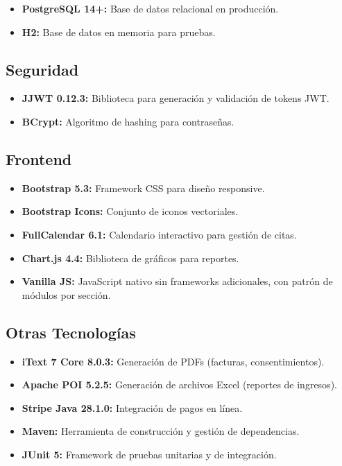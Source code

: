 \begin{itemize}
    \item \textbf{PostgreSQL 14+:} Base de datos relacional en producci\'on.
    \item \textbf{H2:} Base de datos en memoria para pruebas.
\end{itemize}

\subsection{Seguridad}

\begin{itemize}
    \item \textbf{JJWT 0.12.3:} Biblioteca para generaci\'on y validaci\'on de tokens JWT.
    \item \textbf{BCrypt:} Algoritmo de hashing para contrase\~nas.
\end{itemize}

\subsection{Frontend}

\begin{itemize}
    \item \textbf{Bootstrap 5.3:} Framework CSS para dise\~no responsive.
    \item \textbf{Bootstrap Icons:} Conjunto de iconos vectoriales.
    \item \textbf{FullCalendar 6.1:} Calendario interactivo para gesti\'on de citas.
    \item \textbf{Chart.js 4.4:} Biblioteca de gr\'aficos para reportes.
    \item \textbf{Vanilla JS:} JavaScript nativo sin frameworks adicionales, con patr\'on de m\'odulos por secci\'on.
\end{itemize}

\subsection{Otras Tecnolog\'ias}

\begin{itemize}
    \item \textbf{iText 7 Core 8.0.3:} Generaci\'on de PDFs (facturas, consentimientos).
    \item \textbf{Apache POI 5.2.5:} Generaci\'on de archivos Excel (reportes de ingresos).
    \item \textbf{Stripe Java 28.1.0:} Integraci\'on de pagos en l\'inea.
    \item \textbf{Maven:} Herramienta de construcci\'on y gesti\'on de dependencias.
    \item \textbf{JUnit 5:} Framework de pruebas unitarias y de integraci\'on.
\end{itemize}

